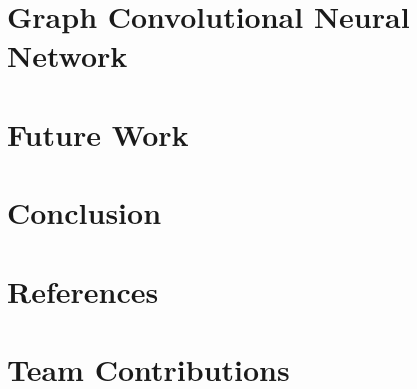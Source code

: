 \documentclass[twoside,twocolumn,12pt]{article}
\begin{document}
\section{Graph Convolutional Neural Network}
\label{sec:graph_GCN}


\section{Future Work}
\label{sec:future_work}


\section{Conclusion}
\label{sec:conclusion}


\section{References}
\label{sec:ref}


\section*{Team Contributions}
\label{sec:team}


% 
%
\end{document}
